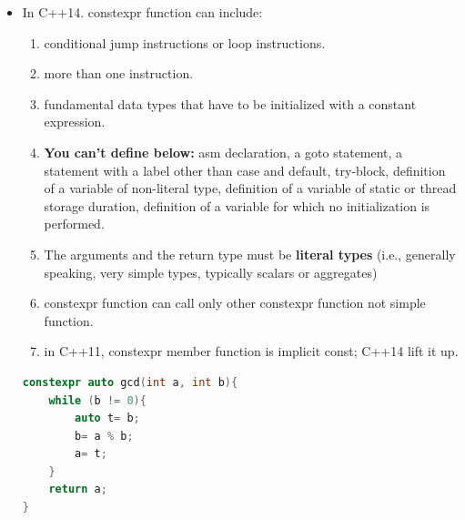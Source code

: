 \documentclass[a4paper,12pt,twoside]{book}
\newcommand{\Hilight}[1]{\makebox[0pt][l]{\color{yellow}\rule[-3pt]{#1em}{11pt}}}
\begin{document}
\begin{itemize}
\begin{enumerate}
	\end{enumerate}
\begin{lstlisting}[frame=single, language=c++]
constexpr int gcd(int a, int b){
	return (b== 0) ? a : gcd(b, a % b);
	//can only have one return statement.
	$\Hilight{35}$//but thank for ternary operator and recursion.
}
\end{lstlisting}

	\item In C++14. constexpr function can include: 
		\begin{enumerate}
		\item conditional jump instructions or loop instructions.
		\item more than one instruction.
		\item fundamental data types that have to be initialized with a constant expression.
		\item \textbf{You can't define below:} asm declaration, a goto statement, a statement with a label other than case and default, try-block, definition of a variable of non-literal type, definition of a variable of static or thread storage duration, definition of a variable for which no initialization is performed.
		
		\item The arguments and the return type must be \textbf{literal types} (i.e., generally speaking, very simple types, typically scalars or aggregates)
		
		\item constexpr function can call only other constexpr function not simple function.
		
		\item in C++11, constexpr member function is implicit const; C++14 lift it up.
	\end{enumerate}
\begin{lstlisting}[frame=single, language=c++]
constexpr auto gcd(int a, int b){
	while (b != 0){
		auto t= b;
		b= a % b;
		a= t;
	}
	return a;
}
\end{lstlisting}


\end{itemize}
\end{document}
